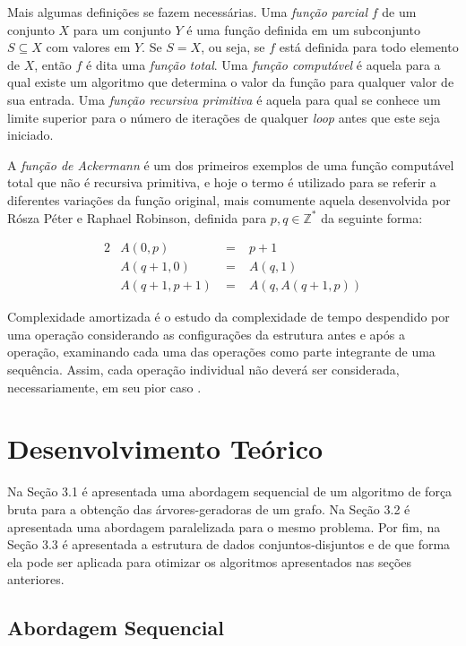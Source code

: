 \documentclass[article,a4paper,12pt,brazil,sumario=tradicional]{abntex2}
\theoremstyle{definition} %
\begin{document}
Mais algumas definições se fazem necessárias. Uma \textit{função parcial} $f$ de um conjunto $X$ para um conjunto $Y$ é uma função definida em um subconjunto $S \subseteq X$ com valores em $Y$. Se $S = X$, ou seja, se $f$ está definida para todo elemento de $X$, então $f$ é dita uma \textit{função total}. Uma \textit{função computável} é aquela para a qual existe um algoritmo que determina o valor da função para qualquer valor de sua entrada. Uma \textit{função recursiva primitiva} é aquela para qual se conhece um limite superior para o número de iterações de qualquer \textit{loop} antes que este seja iniciado.

A \textit{função de Ackermann} \cite{Ackermann1928} é um dos primeiros exemplos de uma função computável total que não é recursiva primitiva, e hoje o termo é utilizado para se referir a diferentes variações da função original, mais comumente aquela desenvolvida por Rósza Péter e Raphael Robinson, definida para $p,q \in \mathbb{Z}^*$ da seguinte forma:

\begin{alignat*}{2}
    &A(0, p) &\;=\;&p + 1 \\
    &A(q+1, 0) &\;=\;& A(q, 1) \\
    &A(q+1, p+1) &\;=\;& A(q, A(q+1, p))
\end{alignat*}

Complexidade amortizada é o estudo da complexidade de tempo despendido por uma operação considerando as configurações da estrutura antes e após a operação, examinando cada uma das operações como parte integrante de uma sequência. Assim, cada operação individual não deverá ser considerada, necessariamente, em seu pior caso \cite{szwarcfiter1994estruturas}.

\section{Desenvolvimento Teórico}

Na Seção 3.1 é apresentada uma abordagem sequencial de um algoritmo de força bruta para a obtenção das árvores-geradoras de um grafo. Na Seção 3.2 é apresentada uma abordagem paralelizada para o mesmo problema. Por fim, na Seção 3.3 é apresentada a estrutura de dados conjuntos-disjuntos e de que forma ela pode ser aplicada para otimizar os algoritmos apresentados nas seções anteriores.

\subsection{Abordagem Sequencial}
\label{abordagem-sequencial}
\end{document}

